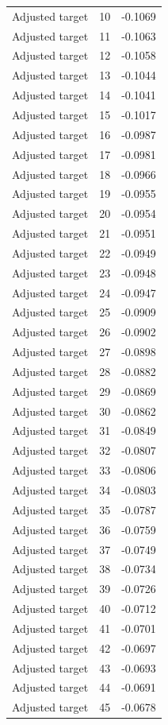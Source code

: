 \begin{table}[htbp]
\begin{tabular}{lll}
Adjusted target & 10 & -0.1069 \\
Adjusted target & 11 & -0.1063 \\
Adjusted target & 12 & -0.1058 \\
Adjusted target & 13 & -0.1044 \\
Adjusted target & 14 & -0.1041 \\
Adjusted target & 15 & -0.1017 \\
Adjusted target & 16 & -0.0987 \\
Adjusted target & 17 & -0.0981 \\
Adjusted target & 18 & -0.0966 \\
Adjusted target & 19 & -0.0955 \\
Adjusted target & 20 & -0.0954 \\
Adjusted target & 21 & -0.0951 \\
Adjusted target & 22 & -0.0949 \\
Adjusted target & 23 & -0.0948 \\
Adjusted target & 24 & -0.0947 \\
Adjusted target & 25 & -0.0909 \\
Adjusted target & 26 & -0.0902 \\
Adjusted target & 27 & -0.0898 \\
Adjusted target & 28 & -0.0882 \\
Adjusted target & 29 & -0.0869 \\
Adjusted target & 30 & -0.0862 \\
Adjusted target & 31 & -0.0849 \\
Adjusted target & 32 & -0.0807 \\
Adjusted target & 33 & -0.0806 \\
Adjusted target & 34 & -0.0803 \\
Adjusted target & 35 & -0.0787 \\
Adjusted target & 36 & -0.0759 \\
Adjusted target & 37 & -0.0749 \\
Adjusted target & 38 & -0.0734 \\
Adjusted target & 39 & -0.0726 \\
Adjusted target & 40 & -0.0712 \\
Adjusted target & 41 & -0.0701 \\
Adjusted target & 42 & -0.0697 \\
Adjusted target & 43 & -0.0693 \\
Adjusted target & 44 & -0.0691 \\
Adjusted target & 45 & -0.0678 \\

\end{tabular}
\end{table}
